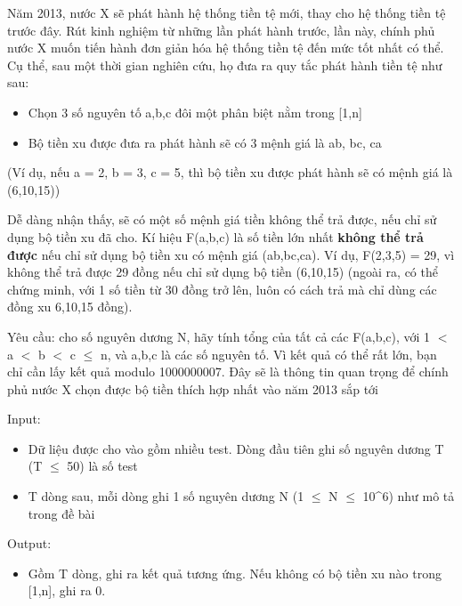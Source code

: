 



    Năm 2013, nước X sẽ phát hành hệ thống tiền tệ mới, thay cho hệ thống tiền tệ trước đây. Rút kinh nghiệm từ những lần phát hành trước, lần này, chính phủ nước X muốn tiến hành đơn giản hóa hệ thống tiền tệ đến mức tốt nhất có thể. Cụ thể, sau một thời gian nghiên cứu, họ đưa ra quy tắc phát hành tiền tệ như sau:   
\begin{itemize}
	\item 

      Chọn  3 số nguyên tố a,b,c đôi một phân biệt nằm trong [1,n]     
	\item 

      Bộ  tiền xu được đưa ra phát hành sẽ có 3 mệnh giá là  ab, bc, ca     
\end{itemize}

    (Ví dụ, nếu a = 2, b = 3, c = 5, thì bộ tiền xu được phát hành sẽ có mệnh giá là (6,10,15))   



    Dễ dàng nhận thấy, sẽ có một số mệnh giá tiền không thể trả được, nếu chỉ sử dụng bộ tiền xu đã cho. Kí hiệu F(a,b,c) là số tiền lớn nhất   \textbf{     không thể trả được    }    nếu chỉ sử dụng bộ tiền xu có mệnh giá (ab,bc,ca). Ví dụ, F(2,3,5) = 29, vì không thể trả được 29 đồng nếu chỉ sử dụng bộ tiền (6,10,15) (ngoài ra, có thể chứng minh, với 1 số tiền từ 30 đồng trở lên, luôn có cách trả mà chỉ dùng các đồng xu 6,10,15 đồng).   



    Yêu cầu: cho số nguyên dương N, hãy tính tổng của tất cả các F(a,b,c), với 1 $<$ a $<$ b $<$ c  $\le$  n, và a,b,c là các số nguyên tố. Vì kết quả có thể rất lớn, bạn chỉ cần lấy kết quả modulo 1000000007. Đây sẽ là thông tin quan trọng để chính phủ nước X chọn được bộ tiền thích hợp nhất vào năm 2013 sắp tới   



    Input:   
\begin{itemize}
	\item 

      Dữ  liệu được cho vào gồm nhiều test. Dòng đầu tiên ghi  số nguyên dương T (T  $\le$  50) là số test     
	\item 

      T  dòng sau, mỗi dòng ghi 1 số nguyên dương N (1  $\le$  N  $\le$   10^6) như mô tả trong đề bài     
\end{itemize}

    Output:   
\begin{itemize}
	\item 

      Gồm  T dòng, ghi ra kết quả tương ứng. Nếu không có bộ  tiền xu nào trong [1,n], ghi ra 0.     
\end{itemize}



